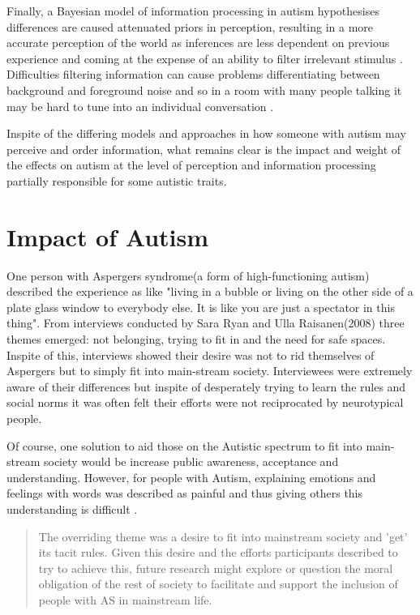 Finally, a Bayesian model of information processing in autism hypothesises differences are caused attenuated priors in perception, resulting in a more accurate perception of the world as inferences are less dependent on previous experience and coming at the expense of an ability to filter irrelevant stimulus \cite{bayes}. Difficulties filtering information can cause problems differentiating between background and foreground noise and so in a room with many people talking it may be hard to tune into an individual conversation \cite{bayes}. 

Inspite of the differing models and approaches in how someone with autism may perceive and order information, what remains clear is the impact and weight of the effects on autism at the level of perception and information processing partially responsible for some autistic traits. 

\section{Impact of Autism}
One person with Aspergers syndrome(a form of high-functioning autism) described the experience as like "living in a bubble or living on the other side of a plate glass window to everybody else. It is like you are just a spectator in this thing"\cite{aspieway}. From interviews conducted by Sara Ryan and Ulla Raisanen(2008) three themes emerged: not belonging, trying to fit in and the need for safe spaces. Inspite of this, interviews showed their desire was not to rid themselves of Aspergers but to simply fit into main-stream society. Interviewees were extremely aware of their differences but inspite of desperately trying to learn the rules and social norms it was often felt their efforts were not reciprocated by neurotypical people.

Of course, one solution to aid those on the Autistic spectrum to fit into main-stream society would be increase public awareness, acceptance and understanding. However, for people with Autism, explaining emotions and feelings with words was described as painful and thus giving others this understanding is difficult \cite{aspieway}. 

\begin{quote}
The overriding theme was a desire to fit into mainstream society and 'get' its tacit rules. Given this desire and the
efforts participants described to try to achieve this, future research might explore or question the moral obligation of the rest of society to facilitate and support the inclusion of people with AS in mainstream life. \cite{aspieway}
\end{quote}

